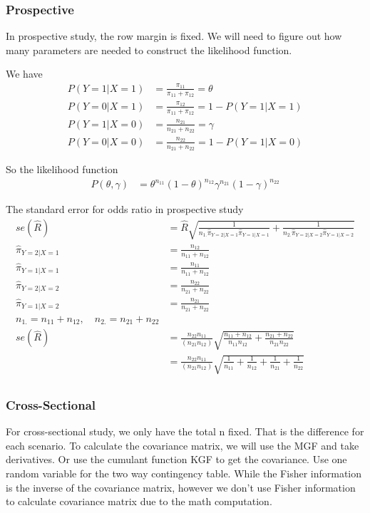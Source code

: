 \subsubsection{Prospective}
In prospective study, the row margin is fixed. We will need to figure out how many parameters are needed to construct the likelihood function.

We have
	\begin{align*}
	P(Y=1|X=1) &= \frac{\pi_{11}}{\pi_{11} + \pi_{12}} = \theta\\
	P(Y=0|X=1) &= \frac{\pi_{12}}{\pi_{11} + \pi_{12}} = 1 - P(Y=1|X=1)\\
	P(Y=1|X=  0) &= \frac{n_{21}}{n_{21}+ n_{22}} = \gamma \\
	P(Y= 0|X=  0) &=  \frac{n_{22}}{n_{21}+ n_{22}} = 1 - P(Y=1|X=  0)
\end{align*}

So the likelihood function
\begin{align*}
	P(\theta, \gamma) &= \theta^{n_{11}} (1-\theta)^{n_{12}} \gamma^{n_{21}} (1-\gamma)^{n_{22}}
\end{align*}

The standard error for odds ratio in prospective study
	\begin{align*}
		se(\hat R) &= \hat{R} \sqrt{\frac{1}{n_{1.}\hat{\pi}_{Y=2|X=1}\hat{\pi}_{Y=1|X=1} } + \frac{1}{n_{2.}\hat{\pi}_{Y=2|X=2} \hat {\pi}_{Y=1|X=2} } }\\
		\hat{\pi}_{Y=2|X=1} &= \frac{n_{12}}{n_{11}+ n_{12}}\\
		\hat{\pi}_{Y=1|X=1} &= \frac{n_{11}}{n_{11}+ n_{12}}\\
		\hat{\pi}_{Y=2|X=2} &=  \frac{n_{22}}{n_{21} + n_{22}}\\
		\hat {\pi}_{Y=1|X=2} &= \frac{n_{21}}{n_{21} + n_{22}}\\
		n_{1.} = n_{11}+ n_{12}, \quad n_{2.}=n_{21} + n_{22}\\
		se(\hat R) &= \frac{n_{22}n_{11}}{(n_{21}n_{12})} \sqrt{\frac{n_{11}+n_{12}}{n_{11}n_{12}} + \frac{n_{21}+n_{22}}{n_{21}n_{22}} }\\
		&= \frac{{n_{22}n_{11}}}{(n_{21}n_{12})} \sqrt{\frac{1}{n_{11}} + \frac{1}{n_{12}} + \frac{1}{n_{21}} + \frac{1}{n_{22}}}\\
	\end{align*}
	
	\subsubsection{Cross-Sectional}
	For cross-sectional study, we only have the total n fixed. That is the difference for each scenario. 
	To calculate the covariance matrix, we will use the MGF and take derivatives. Or use the cumulant function KGF to get the covariance.
	Use one random variable for the two way contingency table. While the Fisher information is the inverse of the covariance matrix, however we don't use Fisher information to calculate covariance matrix due to the math computation.\\
	
